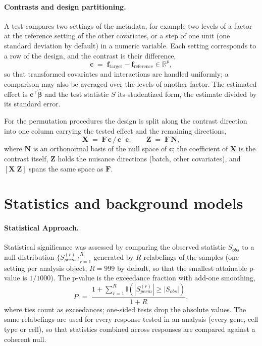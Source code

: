 \documentclass{article}
\begin{document}
\paragraph{Contrasts and design partitioning.}
A test compares two settings of the metadata, for example two levels of a factor at the reference setting of the other covariates, or a step of one unit (one standard deviation by default) in a numeric variable. Each setting corresponds to a row of the design, and the contrast is their difference,
\begin{equation}
\mathbf{c} \;=\; \mathbf{f}_{\mathrm{target}} - \mathbf{f}_{\mathrm{reference}} \in \mathbb{R}^p ,
\end{equation}
so that transformed covariates and interactions are handled uniformly; a comparison may also be averaged over the levels of another factor. The estimated effect is $\mathbf{c}^\top \hat{\boldsymbol{\beta}}$ and the test statistic $S$ its studentized form, the estimate divided by its standard error.

For the permutation procedures the design is split along the contrast direction into one column carrying the tested effect and the remaining directions,
\begin{equation}
\mathbf{X} \;=\; \mathbf{F}\,\mathbf{c}\,/\,\mathbf{c}^\top\mathbf{c}, \qquad \mathbf{Z} \;=\; \mathbf{F}\,\mathbf{N},
\end{equation}
where $\mathbf{N}$ is an orthonormal basis of the null space of $\mathbf{c}$; the coefficient of $\mathbf{X}$ is the contrast itself, $\mathbf{Z}$ holds the nuisance directions (batch, other covariates), and $[\mathbf{X}\;\mathbf{Z}]$ spans the same space as $\mathbf{F}$.


\section{Statistics and background models}

\paragraph{Statistical Approach.}
Statistical significance was assessed by comparing the observed statistic $S_{obs}$ to a null distribution $\{S_{perm}^{(r)}\}_{r=1}^R$ generated by $R$ relabelings of the samples (one setting per analysis object, $R = 999$ by default, so that the smallest attainable p-value is $1/1000$). The p-value is the exceedance fraction with add-one smoothing,
\begin{equation}
P \;=\; \frac{1 + \sum_{r=1}^R \mathbb{I}(|S_{perm}^{(r)}| \ge |S_{obs}|)}{1 + R},
\end{equation}
where ties count as exceedances; one-sided tests drop the absolute values. The same relabelings are used for every response tested in an analysis (every gene, cell type or cell), so that statistics combined across responses are compared against a coherent null.
\end{document}
